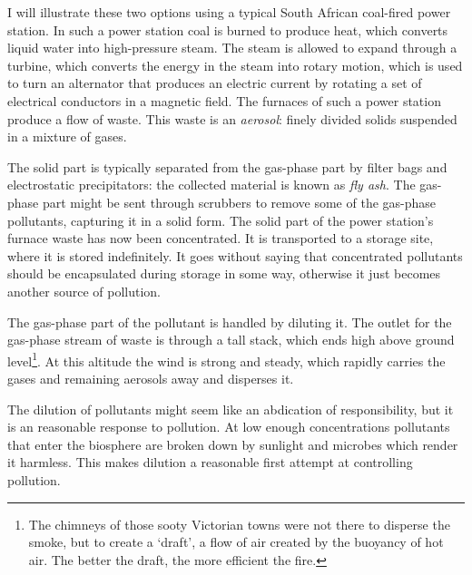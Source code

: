 
I will illu\-strate these two options using a typical South Afri\-can coal-fired
pow\-er sta\-tion. In such a power station coal is burned to produce heat, which
converts liquid water into high-pressure steam. The steam is allowed to expand
through a turbine, which converts the energy in the steam into rotary motion,
which is used to turn an alternator that produces an electric current by
rotating a set of electrical conductors in a magnetic field. The furnaces of
such a power station produce a flow of waste. This waste is an \textit{aerosol}:
finely divided solids suspended in a mixture of gases. 

The solid part is typically separated from the gas-phase part by filter bags and
electrostatic precipitators: the collected material is known as \textit{fly
ash}. The gas-phase part might be sent through scrubbers to remove some of the
gas-phase pollutants, capturing it in a solid form. The solid part of the power
station's furnace waste has now been concentrated. It is transported to a
storage site, where it is stored indefinitely. It goes without saying that
concentrated pollutants should be encapsulated during storage in some way,
otherwise it just becomes another source of pollution.

The gas-phase part of the pollutant is handled by diluting it. The outlet for
the gas-phase stream of waste is through a tall stack, which ends high above
ground level\footnote{The chimneys of those sooty Victorian towns were not there
to disperse the smoke, but to create a `draft', a flow of air created by the
buoyancy of hot air. The better the draft, the more efficient the fire.}. At
this altitude the wind is strong and steady, which rapidly carries the gases and
remaining aerosols away and disperses it.

The dilution of pollutants might seem like an abdication of responsibility, but
it is an reasonable response to pollution. At low enough concentrations
pollutants that enter the biosphere are broken down by sunlight and microbes
which render it harmless. This makes dilution a reasonable first attempt at
controlling pollution.

